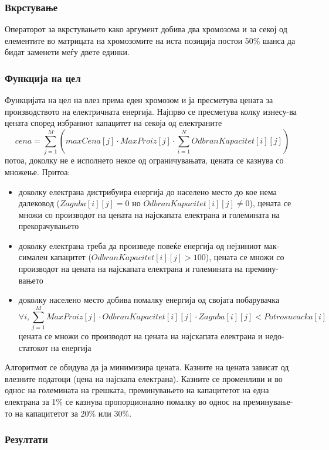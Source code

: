 \documentclass{article}
\begin{document}
\subsubsection{Вкрстување}

Операторот за вкрстувањето како аргумент добива два хромозома и за секој од елементите во матрицата на хромозомите на иста позиција постои 50\% шанса да бидат заменети меѓу двете единки. 
 
\subsubsection{Функција на цел}

Функцијата на цел на влез прима еден хромозом и ја пресметува цената за производството на електричната енергија. Најпрво се пресметува колку изнесу-ва цената според избраниот капацитет на секоја од електраните 
\[ cena = \sum_{j=1}^{M} (maxCena[j] \cdot MaxProiz[j] \cdot  \sum_{i=1}^{N} OdbranKapacitet[i][j] )\]
потоа, доколку не е исполнето некое од ограничувањата, цената се казнува со множење. Притоа:
\begin{itemize}
\item доколку електрана дистрибуира енергија до населено место до кое нема далековод ($Zaguba[i][j] = 0$ но $OdbranKapacitet[i][j] \neq 0$), цената се множи со производот на цената на најскапата електрана и големината на прекорачувањето  
\item доколку електрана треба да произведе повеќе енергија од нејзиниот мак-симален капацитет ($OdbranKapacitet[i][j] > 100$), цената се множи со производот на цената на најскапата електрана и големината на премину-вањето 
\item доколку населено место добива помалку енергија од својата побарувачка \[ \forall i, \sum_{j=1}^{M} MaxProiz[j] \cdot OdbranKapacitet[i][j] \cdot Zaguba[i][j] < Potrosuvacka[i]\] цената се множи со производот на цената на најскапата електрана и недо-статокот на енергија 
\end{itemize}

Алгоритмот се обидува да ја минимизира цената. Казните на цената зависат од влезните податоци (цена на најскапа електрана). Казните се променливи и во однос на големината на грешката, преминувањето на капацитетот на една електрана за 1\% се казнува пропорционално помалку во однос на преминување-то на капацитетот за 20\% или 30\%.

\subsubsection{Резултати}
 
\end{document}
